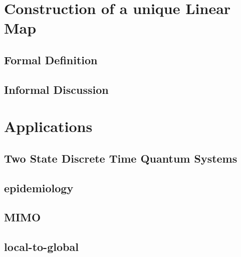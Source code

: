 \documentclass{article}
\begin{document}
\section{Construction of a unique Linear Map}
\subsection{Formal Definition}
\subsection{Informal Discussion}

\section{Applications}
\subsection{Two State Discrete Time Quantum Systems}
\subsection{epidemiology}
\subsection{MIMO}
\subsection{local-to-global}
\end{document}
